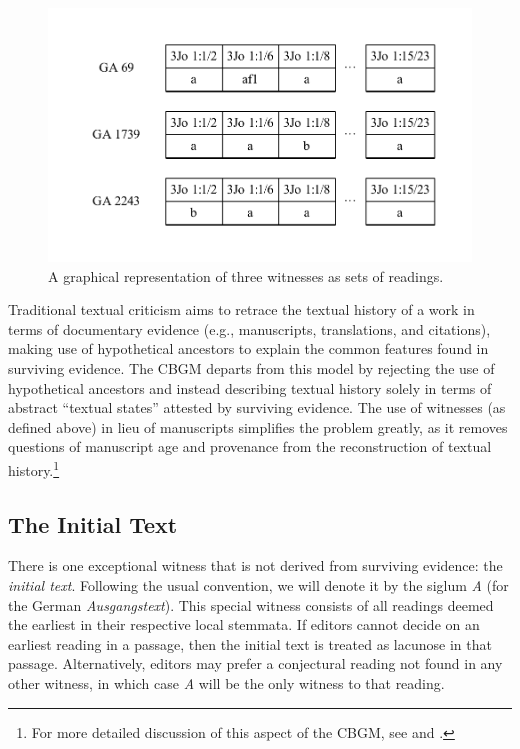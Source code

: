 \documentclass[a4paper, 12pt]{article}
\begin{document}
	\begin{figure}[h!]
		\centering
		\includegraphics[scale=0.6666]{../graphics/witnesses.pdf}
		\caption{A graphical representation of three witnesses as sets of readings.}
		\label{fig:witnesses}
	\end{figure}
	\noindent
	Traditional textual criticism aims to retrace the textual history of a work in terms of documentary evidence (e.g., manuscripts, translations, and citations), making use of hypothetical ancestors to explain the common features found in surviving evidence. The CBGM departs from this model by rejecting the use of hypothetical ancestors and instead describing textual history solely in terms of abstract ``textual states'' attested by surviving evidence. The use of witnesses (as defined above) in lieu of manuscripts simplifies the problem greatly, as it removes questions of manuscript age and provenance from the reconstruction of textual history.\footnote{For more detailed discussion of this aspect of the CBGM, see \cite{Wachtel15} and \cite{Carlson15}.}
	
	\newpage
	
	\subsection{The Initial Text}\label{subsec:initial-text}
	There is one exceptional witness that is not derived from surviving evidence: the \emph{initial text}. Following the usual convention, we will denote it by the siglum \emph{A} (for the German \emph{Ausgangstext}). This special witness consists of all readings deemed the earliest in their respective local stemmata. If editors cannot decide on an earliest reading in a passage, then the initial text is treated as lacunose in that passage. Alternatively, editors may prefer a conjectural reading not found in any other witness, in which case \emph{A} will be the only witness to that reading.
	
\end{document}
